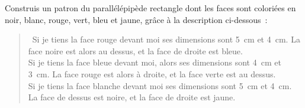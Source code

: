 Construis un patron du parallélépipède rectangle dont les faces sont coloriées en noir, blanc, rouge, vert, bleu et jaune, grâce à la description ci-dessous :
\begin{quote}
  \og Si je tiens la face rouge devant moi ses dimensions sont 5~cm et
  4~cm. La face noire est alors au dessus, et la face de droite est bleue.\\
  Si je tiens la face bleue devant moi, alors ses dimensions sont 4~cm
  et 3~cm. La face rouge est alors à droite, et la face verte est au
  dessus.\\
  Si je tiens la face blanche devant moi ses dimensions sont 5~cm et
  4~cm. La face de dessus est noire, et la face de droite est jaune.\fg
\end{quote}